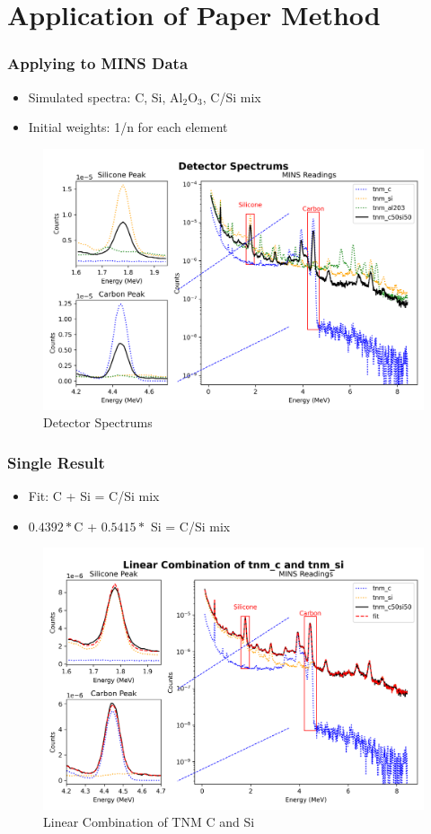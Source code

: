 \documentclass[xcolor=dvipsnames,envcountsect]{beamer}
\begin{document}
\section{Application of Paper Method}
\begin{frame}
  \frametitle{Applying to MINS Data}
  \begin{itemize}
    \item Simulated spectra: C, Si, Al$_2$O$_3$, C/Si mix
    \item Initial weights: 1/n for each element
  \end{itemize}
  \begin{figure}
      \centering
      \includegraphics[width=.5\linewidth]{Figures/DetectorSpectrumsCF.png}
      \caption{Detector Spectrums}
      \label{fig:DetectorSpectrumsCF}
  \end{figure}
\end{frame}

\begin{frame}
  \frametitle{Single Result}
  \begin{itemize}
    \item Fit: C + Si = C/Si mix
    \item $0.4392 * $C + $0.5415 *$ Si = C/Si mix
  \end{itemize}
  \begin{figure}
      \centering
      \includegraphics[width=.5\linewidth]{Figures/LinearCombinationTNMCF.png}
      \caption{Linear Combination of TNM C and Si}
      \label{fig:LinearCombinationTNMCF}
  \end{figure}
\end{frame}
\end{document}

